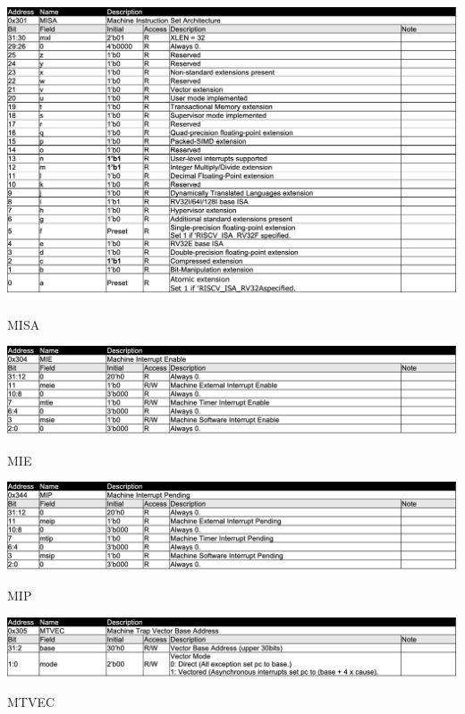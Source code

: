 \begin{table}[H]
    \includegraphics[width=1.00\columnwidth]{./Table/MISA.png}
    \caption{MISA}
    \label{tb:MISA}
\end{table}

\begin{table}[H]
    \includegraphics[width=1.00\columnwidth]{./Table/MIE.png}
    \caption{MIE}
    \label{tb:MIE}
\end{table}

\begin{table}[H]
    \includegraphics[width=1.00\columnwidth]{./Table/MIP.png}
    \caption{MIP}
    \label{tb:MIP}
\end{table}

\begin{table}[H]
    \includegraphics[width=1.00\columnwidth]{./Table/MTVEC.png}
    \caption{MTVEC}
    \label{tb:MTVEC}
\end{table}

